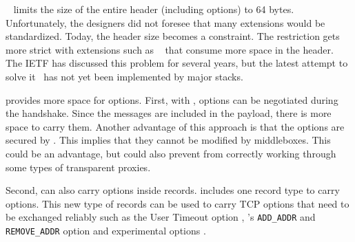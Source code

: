 
\tcp~\cite{rfc793} limits the size of the entire \tcp header (including options) to 64 bytes. Unfortunately, the \tcp designers did not foresee that many \tcp extensions would be standardized. Today, the \tcp header size becomes a constraint.
The restriction gets more strict with extensions such as \mptcp~\cite{rfc6824} that consume more space in the \tcp header. The IETF has discussed this problem for several years, but the latest attempt to solve it~\cite{draft-ietf-tcpm-tcp-edo-10} has not yet been implemented by major \tcp stacks.

\tcpls provides more space for \tcp options. First, with \tcpls, \tcp
options can be negotiated during the \tls handshake. Since the \tls messages are
included in the \tcp payload, there is more space to carry them. Another
advantage of this approach is that the \tcp options are secured by \tls. This
implies that they cannot be modified by middleboxes. This could be an advantage,
but could also prevent \tcpls from correctly working through some types of
transparent \tcp proxies.

Second, \tcpls can also carry \tcp options inside \tls records. \tcpls includes
one record type to carry \tcp options. This new type of records can be used to
carry TCP options that need to be exchanged reliably such as the \tcp User
Timeout option \cite{rfc5482}, \mptcp's \texttt{ADD\_ADDR} and
\texttt{REMOVE\_ADDR} option and experimental \tcp options \cite{rfc6994}.

